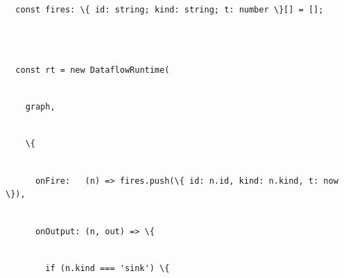 \documentclass[
]{article}
\newcommand{\passthrough}[1]{#1}
\begin{document}
\passthrough{\lstinline!  !}\passthrough{\lstinline!const!}\passthrough{\lstinline! !}\passthrough{\lstinline!fires:!}\passthrough{\lstinline! !}\passthrough{\lstinline!\{!}\passthrough{\lstinline! !}\passthrough{\lstinline!id:!}\passthrough{\lstinline! !}\passthrough{\lstinline!string;!}\passthrough{\lstinline! !}\passthrough{\lstinline!kind:!}\passthrough{\lstinline! !}\passthrough{\lstinline!string;!}\passthrough{\lstinline! !}\passthrough{\lstinline!t:!}\passthrough{\lstinline! !}\passthrough{\lstinline!number!}\passthrough{\lstinline! !}\passthrough{\lstinline!\}[]!}\passthrough{\lstinline! !}\passthrough{\lstinline!=!}\passthrough{\lstinline! !}\passthrough{\lstinline![];!}\strut \\
\strut \\
\passthrough{\lstinline!  !}\passthrough{\lstinline!const!}\passthrough{\lstinline! !}\passthrough{\lstinline!rt!}\passthrough{\lstinline! !}\passthrough{\lstinline!=!}\passthrough{\lstinline! !}\passthrough{\lstinline!new!}\passthrough{\lstinline! !}\passthrough{\lstinline!DataflowRuntime!}\passthrough{\lstinline!(!}\strut \\
\passthrough{\lstinline!    !}\passthrough{\lstinline!graph,!}\strut \\
\passthrough{\lstinline!    !}\passthrough{\lstinline!\{!}\strut \\
\passthrough{\lstinline!      !}\passthrough{\lstinline!onFire!}\passthrough{\lstinline!:!}\passthrough{\lstinline!   !}\passthrough{\lstinline!(n)!}\passthrough{\lstinline! !}\passthrough{\lstinline!=>!}\passthrough{\lstinline! !}\passthrough{\lstinline!fires.push!}\passthrough{\lstinline!(\{!}\passthrough{\lstinline! !}\passthrough{\lstinline!id:!}\passthrough{\lstinline! !}\passthrough{\lstinline!n.id,!}\passthrough{\lstinline! !}\passthrough{\lstinline!kind:!}\passthrough{\lstinline! !}\passthrough{\lstinline!n.kind!}\passthrough{\lstinline!,!}\passthrough{\lstinline! !}\passthrough{\lstinline!t:!}\passthrough{\lstinline! !}\passthrough{\lstinline!now!}\passthrough{\lstinline! !}\passthrough{\lstinline!\}),!}\strut \\
\passthrough{\lstinline!      !}\passthrough{\lstinline!onOutput!}\passthrough{\lstinline!:!}\passthrough{\lstinline! !}\passthrough{\lstinline!(n,!}\passthrough{\lstinline! !}\passthrough{\lstinline!out)!}\passthrough{\lstinline! !}\passthrough{\lstinline!=>!}\passthrough{\lstinline! !}\passthrough{\lstinline!\{!}\strut \\
\passthrough{\lstinline!        !}\passthrough{\lstinline!if!}\passthrough{\lstinline! !}\passthrough{\lstinline!(!}\passthrough{\lstinline!n.kind!}\passthrough{\lstinline! !}\passthrough{\lstinline!===!}\passthrough{\lstinline! !}\passthrough{\lstinline!'sink')!}\passthrough{\lstinline! !}\passthrough{\lstinline!\{!}\strut \\
\end{document}

